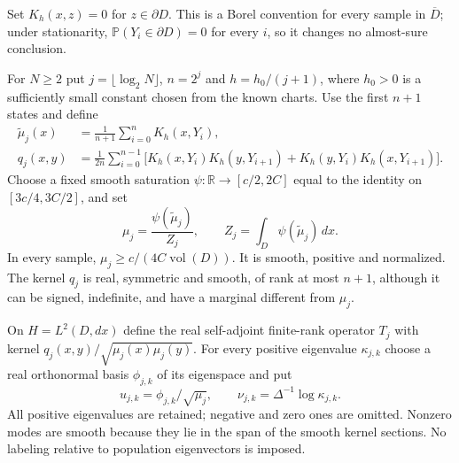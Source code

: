 \documentclass[11pt]{article}
\theoremstyle{remark}\newtheorem{remark}[theorem]{Remark}
\newcommand{\R}{\mathbb R}
\newcommand{\Prob}{\mathbb P}
\newcommand{\dd}{\,dx}
\newcommand{\vol}{\operatorname{vol}}
\begin{document}
Set $K_h(x,z)=0$ for $z\in\partial D$. This is a Borel convention
for every sample in $\overline D$; under stationarity,
$\Prob(Y_i\in\partial D)=0$ for every $i$, so it changes no
almost-sure conclusion.

For $N\geq2$ put $j=\lfloor\log_2N\rfloor$, $n=2^j$ and
$h=h_0/(j+1)$, where $h_0>0$ is a sufficiently small constant chosen from
the known charts. Use the first $n+1$ states and define
\begin{align}
 \widetilde\mu_j(x)&=\frac1{n+1}\sum_{i=0}^nK_h(x,Y_i),\label{density}\\
 q_j(x,y)&=\frac1{2n}\sum_{i=0}^{n-1}
 \big[K_h(x,Y_i)K_h(y,Y_{i+1})+
       K_h(y,Y_i)K_h(x,Y_{i+1})\big].\label{pair}
\end{align}
Choose a fixed smooth saturation $\psi:\R\to[c/2,2C]$ equal to the
identity on $[3c/4,3C/2]$, and set
\begin{equation}\label{saturation}
 \mu_j=\frac{\psi(\widetilde\mu_j)}{Z_j},\qquad
 Z_j=\int_D\psi(\widetilde\mu_j)\dd.
\end{equation}
In every sample, $\mu_j\geq c/(4C\vol(D))$. It is smooth, positive and
normalized. The kernel $q_j$ is real, symmetric and smooth, of rank at most
$n+1$, although it can be signed, indefinite, and have a marginal different
from $\mu_j$.

On $H=L^2(D,dx)$ define the real self-adjoint finite-rank operator $T_j$
with kernel $q_j(x,y)/\sqrt{\mu_j(x)\mu_j(y)}$. For every positive eigenvalue
$\kappa_{j,k}$ choose a real orthonormal basis $\phi_{j,k}$ of its
eigenspace and put
\begin{equation}\label{empiricalmodes}
 u_{j,k}=\phi_{j,k}/\sqrt{\mu_j},\qquad
 \nu_{j,k}=\Delta^{-1}\log\kappa_{j,k}.
\end{equation}
All positive eigenvalues are retained; negative and zero ones are omitted.
Nonzero modes are smooth because they lie in the span of the smooth kernel
sections. No labeling relative to population eigenvectors is imposed.
\end{document}
